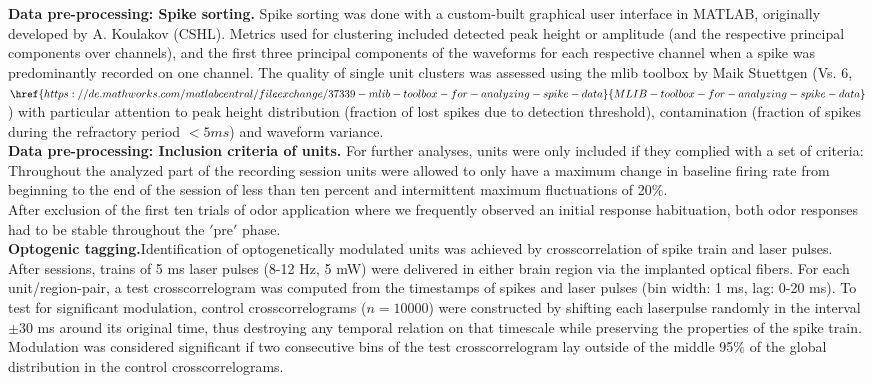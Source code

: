 \begin{framed}
\textbf{Data pre-processing: Spike sorting.} Spike sorting was done with a custom-built graphical user interface in MATLAB, originally developed by A. Koulakov (CSHL). Metrics used for clustering included detected peak height or amplitude (and the respective principal components over channels), and the first three principal components of the waveforms for each respective channel when a spike was predominantly recorded on one channel. The quality of single unit clusters was assessed using the mlib toolbox by Maik Stuettgen (Vs. 6, $\href{https://de.mathworks.com/matlabcentral/fileexchange/37339-mlib-toolbox-for-analyzing-spike-data}{MLIB-toolbox-for-analyzing-spike-data}$) with particular attention to peak height distribution (fraction of lost spikes due to detection threshold), contamination (fraction of spikes during the refractory period $<5ms$) and waveform variance.\\
\textbf{Data pre-processing: Inclusion criteria of units.} For further analyses, units were only included if they complied with a set of criteria: Throughout the analyzed part of the recording session units were allowed to only have a maximum change in baseline firing rate from beginning to the end of the session of less than ten percent and intermittent maximum fluctuations of 20$\%$.\\ After exclusion of the first ten trials of odor application where we frequently observed an initial response habituation, both odor responses had to be stable throughout the $'$pre$'$ phase.\\\textbf{Optogenic tagging.}Identification of optogenetically modulated units was achieved by crosscorrelation of spike train and laser pulses.\\After sessions, trains of 5 ms laser pulses (8-12 Hz, 5 mW) were delivered in either brain region via the implanted optical fibers. For each unit/region-pair, a test crosscorrelogram was computed from the timestamps of spikes and laser pulses (bin width: 1 ms, lag:  0-20 ms). To test for significant modulation, control crosscorrelograms ($n = 10000$) were constructed by shifting each laserpulse randomly in the interval $\pm$30 ms around its original time, thus destroying any temporal relation on that timescale while preserving the properties of the spike train. Modulation was considered significant if two consecutive bins of the test crosscorrelogram lay outside of the middle 95$\%$ of the global distribution in the control crosscorrelograms. 
\end{framed}
